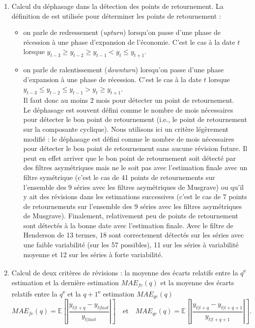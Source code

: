 \documentclass[
  12pt,
  a4paper,french]{article}
\providecommand{\tightlist}{%
  \setlength{\itemsep}{0pt}\setlength{\parskip}{0pt}}
\newcommand\1{\mathds{1}}
\begin{document}
\begin{enumerate}
\def\labelenumi{\arabic{enumi}.}
\tightlist
\item
  Calcul du déphasage dans la détection des points de retournement. La définition de \textcite{Zellner1991} est utilisée pour déterminer les points de retournement :

  \begin{itemize}
  \tightlist
  \item
    on parle de redressement (\emph{upturn}) lorsqu'on passe d'une phase de récession à une phase d'expansion de l'économie.
    C'est le cas à la date \(t\) lorsque \(y_{t-3}\geq y_{t-2}\geq y_{t-1}<y_t\leq y_{t+1}\).\\
  \item
    on parle de ralentissement (\emph{downturn}) lorsqu'on passe d'une phase d'expansion à une phase de récession.
    C'est le cas à la date \(t\) lorsque \(y_{t-3}\leq y_{t-2}\leq y_{t-1}>y_t\geq y_{t+1}\).\\
    Il faut donc au moins 2 mois pour détecter un point de retournement.\\
    Le déphasage est souvent défini comme le nombre de mois nécessaires pour détecter le bon point de retournement (i.e., le point de retournement sur la composante cyclique).
    Nous utilisons ici un critère légèrement modifié : le déphasage est défini comme le nombre de mois nécessaires pour détecter le bon point de retournement sans aucune révision future.
    Il peut en effet arriver que le bon point de retournement soit détecté par des filtres asymétriques mais ne le soit pas avec l'estimation finale avec un filtre symétrique
    (c'est le cas de 41 points de retournements sur l'ensemble des 9 séries avec les filtres asymétriques de Musgrave) ou qu'il y ait des révisions dans les estimations successives (c'est le cas de 7 points de retournements sur l'ensemble des 9 séries avec les filtres asymétriques de Musgrave).
    Finalement, relativement peu de points de retournement sont détectés à la bonne date avec l'estimation finale.
    Avec le filtre de Henderson de 13 termes, 18 sont correctement détectés sur les séries avec une faible variabilité (sur les 57 possibles), 11 sur les séries à variabilité moyenne et 12 sur les séries à forte variabilité.
  \end{itemize}
\item
  Calcul de deux critères de révisions : la moyenne des écarts relatifs entre la \(q\)\textsuperscript{e} estimation et la dernière estimation \(MAE_{fe}(q)\) et la moyenne des écarts relatifs entre la \(q\)\textsuperscript{e} et la \(q+1\)\textsuperscript{e} estimation \(MAE_{qe}(q)\)
  \[
  MAE_{fe}(q)=\mathbb E\left[
  \left|\frac{
  y_{t|t+q} -  y_{t|last}
  }{
   y_{t|last}
  }\right|
  \right]
  \quad\text{et}\quad
  MAE_{qe}(q)=\mathbb E\left[
  \left|\frac{
  y_{t|t+q} - y_{t|t+q+1}
  }{
  y_{t|t+q+1}
  }\right|
  \right].
  \]
\end{enumerate}
\end{document}
